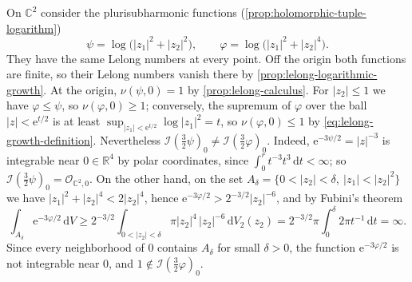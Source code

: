 \begin{example}\label{ex:lelong-numbers-integrability}
On $\mathbb C^2$ consider the plurisubharmonic functions (\cref{prop:holomorphic-tuple-logarithm})
\[
 \psi=\log\bigl(|z_1|^2+|z_2|^2\bigr),\qquad \varphi=\log\bigl(|z_1|^2+|z_2|^4\bigr).
\]
They have the same Lelong numbers at every point. Off the origin both functions are finite, so their Lelong numbers vanish there by \cref{prop:lelong-logarithmic-growth}. At the origin, $\nu(\psi,0)=1$ by \cref{prop:lelong-calculus}. For $|z_2|\leq1$ we have $\varphi\leq\psi$, so $\nu(\varphi,0)\geq1$; conversely, the supremum of $\varphi$ over the ball $|z|<\mathrm e^{t/2}$ is at least $\sup_{|z_1|<\mathrm e^{t/2}}\log|z_1|^2=t$, so $\nu(\varphi,0)\leq1$ by \eqref{eq:lelong-growth-definition}. Nevertheless $\mathcal I(\frac32\psi)_0\neq\mathcal I(\frac32\varphi)_0$. Indeed, $\mathrm e^{-3\psi/2}=|z|^{-3}$ is integrable near $0\in\mathbb R^4$ by polar coordinates, since $\int_0^rt^{-3}t^3\,\mathrm dt<\infty$; so $\mathcal I(\frac32\psi)_0=\mathcal O_{\mathbb C^2,0}$. On the other hand, on the set $A_\delta=\{0<|z_2|<\delta,\ |z_1|<|z_2|^2\}$ we have $|z_1|^2+|z_2|^4<2|z_2|^4$, hence $\mathrm e^{-3\varphi/2}>2^{-3/2}|z_2|^{-6}$, and by Fubini's theorem
\[
 \int_{A_\delta}\mathrm e^{-3\varphi/2}\,\mathrm dV\geq2^{-3/2}\int_{0<|z_2|<\delta}\pi|z_2|^4\,|z_2|^{-6}\,\mathrm dV_2(z_2)=2^{-3/2}\pi\int_0^\delta2\pi t^{-1}\,\mathrm dt=\infty.
\]
Since every neighborhood of $0$ contains $A_\delta$ for small $\delta>0$, the function $\mathrm e^{-3\varphi/2}$ is not integrable near $0$, and $1\notin\mathcal I(\frac32\varphi)_0$.
\end{example}

